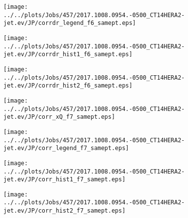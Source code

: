\documentclass[12pt]{article}
\begin{document}
\begin{figure}
\texttt{[image: ../../plots/Jobs/457/2017.1008.0954.-0500\_CT14HERA2-jet.ev/JP/corrdr\_legend\_f6\_samept.eps]}
\caption{}
\end{figure}\newpage\clearpage
\begin{figure}
\texttt{[image: ../../plots/Jobs/457/2017.1008.0954.-0500\_CT14HERA2-jet.ev/JP/corrdr\_hist1\_f6\_samept.eps]}
\caption{}
\end{figure}\newpage\clearpage
\begin{figure}
\texttt{[image: ../../plots/Jobs/457/2017.1008.0954.-0500\_CT14HERA2-jet.ev/JP/corrdr\_hist2\_f6\_samept.eps]}
\caption{}
\end{figure}\newpage\clearpage
\begin{figure}
\texttt{[image: ../../plots/Jobs/457/2017.1008.0954.-0500\_CT14HERA2-jet.ev/JP/corr\_xQ\_f7\_samept.eps]}
\caption{}
\end{figure}\newpage\clearpage
\begin{figure}
\texttt{[image: ../../plots/Jobs/457/2017.1008.0954.-0500\_CT14HERA2-jet.ev/JP/corr\_legend\_f7\_samept.eps]}
\caption{}
\end{figure}\newpage\clearpage
\begin{figure}
\texttt{[image: ../../plots/Jobs/457/2017.1008.0954.-0500\_CT14HERA2-jet.ev/JP/corr\_hist1\_f7\_samept.eps]}
\caption{}
\end{figure}\newpage\clearpage
\begin{figure}
\texttt{[image: ../../plots/Jobs/457/2017.1008.0954.-0500\_CT14HERA2-jet.ev/JP/corr\_hist2\_f7\_samept.eps]}
\caption{}
\end{figure}\newpage\clearpage
\end{document}
